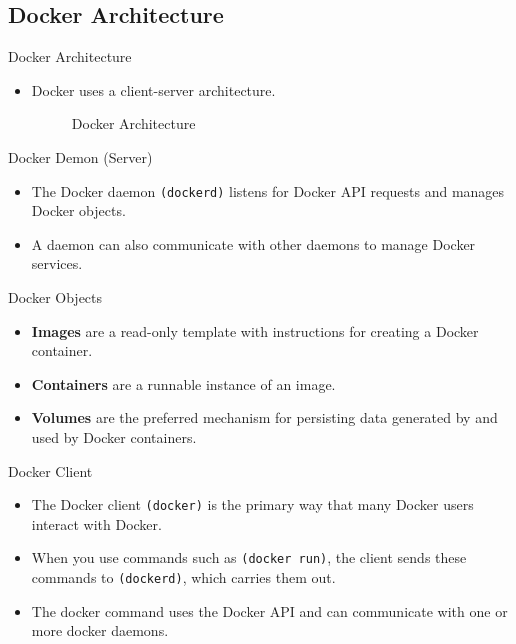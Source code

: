 \subsection{Docker Architecture}\label{subsec:docker-architecture}
\begin{frame}{Docker Architecture}
    \begin{itemize}
        \item Docker uses a client-server architecture.
        \linebreak
        \pause
        \begin{figure}[!t]
            \raggedright
            
            \caption{Docker Architecture}
        \end{figure}
    \end{itemize}
\end{frame}
\begin{frame}{Docker Demon (Server)}
    \begin{itemize}[<+- | alert@+>]
        \item The Docker daemon \texttt{(dockerd)} listens for Docker API requests and manages Docker objects.
        \item A daemon can also communicate with other daemons to manage Docker services.

    \end{itemize}
\end{frame}
\begin{frame}{Docker Objects}
    \begin{itemize}[<+- | alert@+>]
        \item \textbf{Images} are a read-only template with instructions for creating a Docker container.
        \item \textbf{Containers} are a runnable instance of an image.
        \item \textbf{Volumes} are the preferred mechanism for persisting data generated by and used by Docker containers.
    \end{itemize}
\end{frame}
\begin{frame}{Docker Client}
    \begin{itemize}[<+- | alert@+>]
        \item The Docker client \texttt{(docker)} is the primary way that many Docker users interact with Docker.
        \item When you use commands such as \texttt{(docker run)}, the client sends these commands to \texttt{(dockerd)}, which carries them out.
        \item The docker command uses the Docker API and can communicate with one or more docker daemons.
    \end{itemize}
\end{frame}
